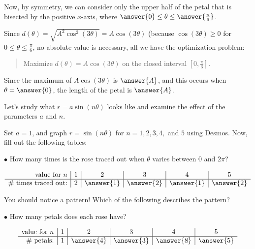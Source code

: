 \documentclass{ximera}
\begin{document}
\begin{exercise}
\begin{exercise}
Now, by symmetry, we can consider only the upper half of the petal that is bisected by the positive $x$-axis, where $\answer{0} \leq \theta \leq \answer{\frac{\pi}{6}}$.

Since $d(\theta) =\sqrt{A^2\cos^2(3\theta)} = A\cos(3\theta)$ (because $\cos(3\theta)\geq 0$ for $0 \leq \theta \leq \frac{\pi}{6}$, no absolute value is necessary, all we have the optimization problem:

\begin{quote}
Maximize $d(\theta) = A\cos(3\theta)$ on the closed interval $\left[0,\frac{\pi}{6}\right]$.
\end{quote}

Since the maximum of $A\cos(3\theta)$ is $\answer{A}$, and this occurs when $\theta = \answer{0}$, the length of the petal is $\answer{A}$.

\end{exercise}
\begin{exercise}
Let's study what $r= a \sin(n \theta)$ looks like and examine the effect of the parameters $a$ and $n$.  

Set $a=1$, and graph $r=\sin(n \theta)$ for $n=1,2,3,4,$ and $5$ using Desmos.  Now, fill out the following tables:

$\bullet$ How many times is the rose traced out when $\theta$ varies between $0$ and $2 \pi$?

\[
\begin{array}{r|c|c|c|c|c}
\textrm{value for } n & 1 & 2 & 3 & 4 & 5 \\
\hline
\textrm{\# times traced out:} & 2 & \answer{1} & \answer{2} & \answer{1} & \answer{2}
\end{array}
\]

\begin{exercise}
You should notice a pattern! Which of the following describes the pattern?
\begin{multipleChoice}
\end{multipleChoice}
\end{exercise}

$\bullet$ How many petals does each rose have?

\[
\begin{array}{r|c|c|c|c|c}
\textrm{value for } n & 1 & 2 & 3 & 4 & 5 \\
\hline
\textrm{\# petals:} & 1 & \answer{4} & \answer{3} & \answer{8} & \answer{5}
\end{array}
\]


\end{exercise}
\end{exercise}
\end{document}

